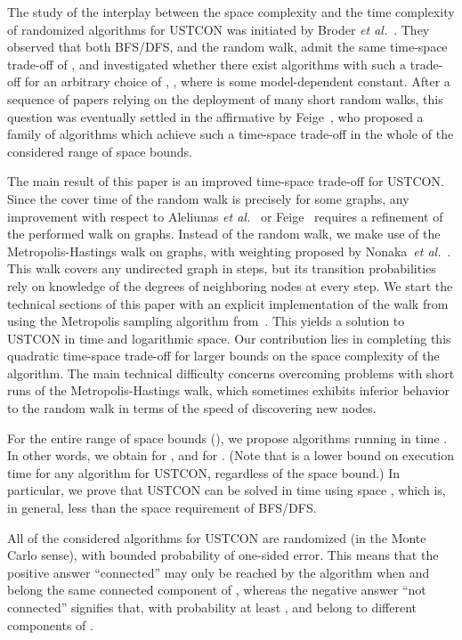 \documentclass[11pt,a4paper]{article}
\newcommand{\Broder}{Broder \etal}
\newcommand{\etal}{\textsl{et al.}\xspace}
\renewcommand{\*}{\hspace*{5mm}}
\begin{document}
The study of the interplay between the space complexity  and the time complexity  of randomized algorithms for USTCON was initiated by \Broder~\cite{BKRU}. They observed that both BFS/DFS, and the random walk, admit the same time-space trade-off of , and investigated whether there exist algorithms with such a trade-off for an arbitrary choice of , , where  is some model-dependent constant. After a sequence of papers relying on the deployment of many short random walks, this question was eventually settled in the affirmative by Feige~\cite{F}, who proposed a family of algorithms which achieve such a time-space trade-off in the whole of the considered range of space bounds. 

The main result of this paper is an improved time-space trade-off for USTCON. Since the cover time of the random walk is precisely  for some graphs, any improvement with respect to Aleliunas \etal~\cite{AKLLR} or Feige~\cite{F} requires a refinement of the performed walk on graphs. Instead of the random walk, we make use of the Metropolis-Hastings walk on graphs, with weighting proposed by Nonaka~\etal~\cite{NOSY}. This walk covers any undirected graph in  steps, but its transition probabilities rely on knowledge of the degrees of neighboring nodes at every step. We start the technical sections of this paper with an explicit implementation of the walk from~\cite{NOSY} using the Metropolis sampling algorithm from~\cite{M51}. This yields a solution to USTCON in  time and logarithmic space. Our contribution lies in completing this quadratic time-space trade-off for larger bounds on the space complexity of the algorithm. The main technical difficulty concerns overcoming problems with short runs of the Metropolis-Hastings walk, which sometimes exhibits inferior behavior to the random walk in terms of the speed of discovering new nodes. 

For the entire range of space bounds (), we propose algorithms running in time . In other words, we obtain  for , and  for . (Note that  is a lower bound on execution time for any algorithm for USTCON, regardless of the space bound.) In particular, we prove that USTCON can be solved in time  using space , which is, in general, less than the space requirement of BFS/DFS. 

All of the considered algorithms for USTCON are randomized (in the Monte Carlo sense), with bounded probability of one-sided error. This means that the positive answer ``connected'' may only be reached by the algorithm when  and  belong the same connected component of , whereas the negative answer ``not connected'' signifies that,  with probability at least ,  and  belong to different components of .
\end{document}
